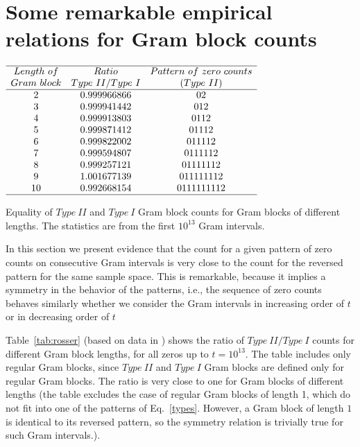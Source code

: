 \documentclass[twoside]{article}
\theoremstyle{definition}
\begin{document}
\section{\label{sec6}Some remarkable empirical relations for Gram block counts}

\begin{table}
\centering \(\begin{array}{ccc}
\hline
Length~of & Ratio&Pattern~of~zero~counts  \\
Gram~block& Type~II/Type~I&(Type~II) \\
\hline
2& 0.999966866&02\\
3& 0.999941442&012\\
4& 0.999913803&0112\\
5& 0.999871412&01112\\
6& 0.999822002&011112\\
7& 0.999594807&0111112\\
8& 0.999257121&01111112\\
9& 1.001677139&011111112\\
10& 0.992668154&0111111112\\
\hline
\end{array}\)
\caption{Equality of $Type~II$ and $Type~I$ Gram block counts for Gram blocks of different lengths. The statistics are from the first $10^{13}$ Gram intervals.} \label{tab:rosser}
\end{table}


In this section we present evidence that the count for
a given pattern of zero counts on consecutive Gram intervals is very close to the count for the reversed pattern for the same sample space. This is remarkable, because it implies a symmetry in the behavior of the patterns, i.e., the  sequence of zero counts behaves similarly whether we consider the Gram intervals in increasing order of $t$ or in decreasing order of $t$

Table~\ref{tab:rosser}  (based on data in \cite{gourdon}) shows the ratio of $Type~II/Type~I$ counts for different Gram block lengths, for all zeros up to $t = 10^{13}$. The table includes only regular Gram blocks, since $Type~II$ and $Type~I$ Gram blocks are defined only for regular Gram blocks. The ratio is very close to one for Gram blocks of different lengths (the table excludes the case of regular Gram blocks of length 1, which do not fit into one of the patterns of Eq.~\ref{types}. However, a Gram block 
of length $1$ is identical to its reversed pattern, so the symmetry relation is trivially true for such Gram intervals.).   
\end{document}
